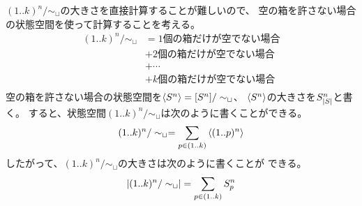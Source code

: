 			$(1..k)^n/\sim_{\sqcup}$の大きさを直接計算することが難しいので、
			空の箱を許さない場合の状態空間を使って計算することを考える。
			\begin{equation*}\begin{split} %
				(1..k)^n/\sim_{\sqcup} &= 1\text{個の箱だけが空でない場合} \\
				&+ 2\text{個の箱だけが空でない場合} \\
				&+ \cdots \\
				&+ k\text{個の箱だけが空でない場合} \\
			\end{split}\end{equation*} %
			空の箱を許さない場合の状態空間を$\mathinner{\langle{S^n}\rangle}=[S^n]/\sim_{\sqcup}$、
			$\mathinner{\langle{S^n}\rangle}$の大きさを$S_{\left|{S}\right|}^n$と書く。
			すると、状態空間$(1..k)^n/\sim_{\sqcup}$は次のように書くことができる。
			\begin{equation*}\begin{split} %
				(1..k)^n/\sim_{\sqcup} = \sum_{p\in(1..k)}\braket{(1..p)^n}
			\end{split}\end{equation*} %
			したがって、$(1..k)^n/\sim_{\sqcup}$の大きさは次のように書くことが
			できる。
			\begin{equation*}\begin{split} %
				\zettai{(1..k)^n/\sim_{\sqcup}} = \sum_{p\in(1..k)}S_p^n
			\end{split}\end{equation*} %

